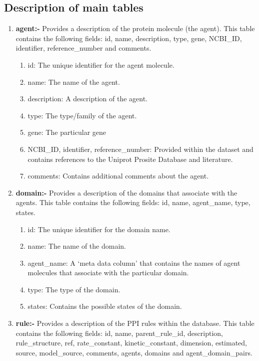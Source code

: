 \documentclass[msc,deptreport,ai]{infthesis}      %
\begin{document}
 \subsection{Description of  main tables}
\begin{enumerate}
	\item \textbf{agent:-} Provides a description of the protein molecule (the agent). This table contains the following fields: id, name, description, type, gene, NCBI\_ID, identifier, reference\_number and comments.
	\begin{enumerate}
		\item id: The unique identifier for the agent molecule.
		\item name: The name of the agent.
		\item description: A description of the agent.
		\item type: The type/family of the agent.
		\item gene: The particular gene
		\item NCBI\_ID, identifier, reference\_number: Provided within the dataset and contains references to the Uniprot Prosite Database \cite{Uniprot-Prosite} and literature.
		\item comments: Contains additional comments about the agent.
	\end{enumerate}
	\item \textbf{domain:-}  Provides a description of the domains that associate with the agents. This table contains the following fields: id, name, agent\_name, type, states. 	
		\begin{enumerate}
		\item id: The unique identifier for the domain name.
		\item name: The name of the domain.
		\item agent\_name: A `meta data column' that contains the names of agent molecules that associate with the particular domain.
		\item type: The type of the domain.
		\item states: Contains the possible states of the domain.
	\end{enumerate}
	\item \textbf{rule:-} Provides a description of the PPI rules within the database. 
	This table contains the following fields: id, name, parent\_rule\_id, description, rule\_structure, ref, rate\_constant, kinetic\_constant, dimension, estimated, source, model\_source, comments, agents, domains and agent\_domain\_pairs.
	\begin{enumerate}

\end{enumerate}
\end{enumerate}
\end{document}
